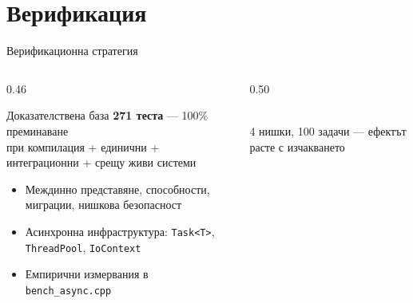 \documentclass[aspectratio=169,12pt]{beamer}
\begin{document}
\section{Верификация}

\begin{frame}{Верификационна стратегия}
    \begin{columns}[T]
        \begin{column}{0.46\textwidth}
            \begin{block}{Доказателствена база}
                \textbf{271 теста} --- 100\% преминаване\\
                {\footnotesize при компилация + единични + интеграционни + срещу живи системи}
            \end{block}
            \begin{itemize}\footnotesize
                \setlength{\itemsep}{0.1em}
                \item Междинно представяне, способности, миграции, нишкова безопасност
                \item Асинхронна инфраструктура: \texttt{Task<T>}, \texttt{ThreadPool}, \texttt{IoContext}
                \item Емпирични измервания в \texttt{bench\_async.cpp}
            \end{itemize}
        \end{column}
        \begin{column}{0.50\textwidth}
            \centering
            \\[-0.8em]
            {\scriptsize 4 нишки, 100 задачи --- ефектът расте с изчакването}
        \end{column}
    \end{columns}
\end{frame}
\end{document}
